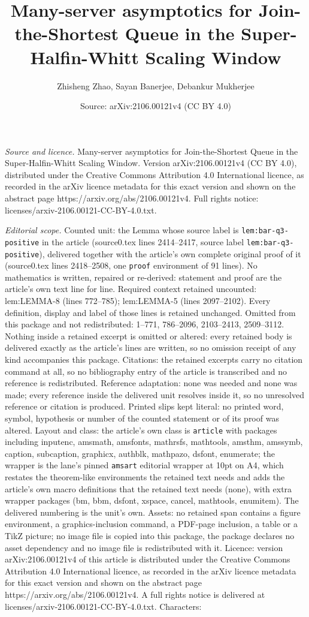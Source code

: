 \documentclass[10pt,a4paper]{amsart}
\title[Many-server asymptotics for Join-the-Shortest Queue in the S]{Many-server asymptotics for Join-the-Shortest Queue in the Super-Halfin-Whitt Scaling Window}
\author{Zhisheng Zhao, Sayan Banerjee, Debankur Mukherjee}
\date{Source: arXiv:2106.00121v4 (CC BY 4.0)}
\begin{document}
\maketitle

\noindent\emph{Source and licence.} Many-server asymptotics for Join-the-Shortest Queue in the Super-Halfin-Whitt Scaling Window. Version arXiv:2106.00121v4 (CC BY 4.0), distributed under the Creative Commons Attribution 4.0 International licence, as recorded in the arXiv licence metadata for this exact version and shown on the abstract page https://arxiv.org/abs/2106.00121v4. Full rights notice: licenses/arxiv-2106.00121-CC-BY-4.0.txt.\par\smallskip

\noindent\textit{Editorial scope.} Counted unit: the Lemma whose source label is \texttt{lem:bar-q3-positive} in the article (source0.tex lines 2414--2417, source label \texttt{lem:bar-q3-positive}), delivered together with the article's own complete original proof of it (source0.tex lines 2418--2508, one \texttt{proof} environment of 91 lines). No mathematics is written, repaired or re-derived: statement and proof are the article's own text line for line. Required context retained uncounted: lem:LEMMA-8 (lines 772--785); lem:LEMMA-5 (lines 2097--2102). Every definition, display and label of those lines is retained unchanged. Omitted from this package and not redistributed: 1--771, 786--2096, 2103--2413, 2509--3112. Nothing inside a retained excerpt is omitted or altered: every retained body is delivered exactly as the article's lines are written, so no omission receipt of any kind accompanies this package. Citations: the retained excerpts carry no citation command at all, so no bibliography entry of the article is transcribed and no reference is redistributed. Reference adaptation: none was needed and none was made; every reference inside the delivered unit resolves inside it, so no unresolved reference or citation is produced. Printed slips kept literal: no printed word, symbol, hypothesis or number of the counted statement or of its proof was altered. Layout and class: the article's own class is \texttt{article} with packages including inputenc, amsmath, amsfonts, mathrsfs, mathtools, amsthm, amssymb, caption, subcaption, graphicx, authblk, mathpazo, dsfont, enumerate; the wrapper is the lane's pinned \texttt{amsart} editorial wrapper at 10pt on A4, which restates the theorem-like environments the retained text needs and adds the article's own macro definitions that the retained text needs (none), with extra wrapper packages (bm, bbm, dsfont, xspace, cancel, mathtools, enumitem). The delivered numbering is the unit's own. Assets: no retained span contains a figure environment, a graphics-inclusion command, a PDF-page inclusion, a table or a TikZ picture; no image file is copied into this package, the package declares no asset dependency and no image file is redistributed with it. Licence: version arXiv:2106.00121v4 of this article is distributed under the Creative Commons Attribution 4.0 International licence, as recorded in the arXiv licence metadata for this exact version and shown on the abstract page https://arxiv.org/abs/2106.00121v4. A full rights notice is delivered at licenses/arxiv-2106.00121-CC-BY-4.0.txt. Characters: 
\end{document}
